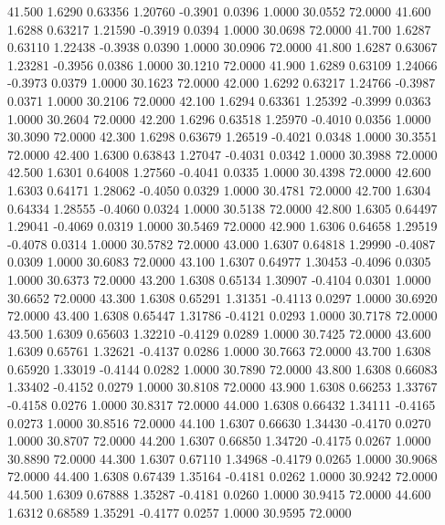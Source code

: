   41.500   1.6290   0.63356   1.20760  -0.3901   0.0396   1.0000  30.0552  72.0000
  41.600   1.6288   0.63217   1.21590  -0.3919   0.0394   1.0000  30.0698  72.0000
  41.700   1.6287   0.63110   1.22438  -0.3938   0.0390   1.0000  30.0906  72.0000
  41.800   1.6287   0.63067   1.23281  -0.3956   0.0386   1.0000  30.1210  72.0000
  41.900   1.6289   0.63109   1.24066  -0.3973   0.0379   1.0000  30.1623  72.0000
  42.000   1.6292   0.63217   1.24766  -0.3987   0.0371   1.0000  30.2106  72.0000
  42.100   1.6294   0.63361   1.25392  -0.3999   0.0363   1.0000  30.2604  72.0000
  42.200   1.6296   0.63518   1.25970  -0.4010   0.0356   1.0000  30.3090  72.0000
  42.300   1.6298   0.63679   1.26519  -0.4021   0.0348   1.0000  30.3551  72.0000
  42.400   1.6300   0.63843   1.27047  -0.4031   0.0342   1.0000  30.3988  72.0000
  42.500   1.6301   0.64008   1.27560  -0.4041   0.0335   1.0000  30.4398  72.0000
  42.600   1.6303   0.64171   1.28062  -0.4050   0.0329   1.0000  30.4781  72.0000
  42.700   1.6304   0.64334   1.28555  -0.4060   0.0324   1.0000  30.5138  72.0000
  42.800   1.6305   0.64497   1.29041  -0.4069   0.0319   1.0000  30.5469  72.0000
  42.900   1.6306   0.64658   1.29519  -0.4078   0.0314   1.0000  30.5782  72.0000
  43.000   1.6307   0.64818   1.29990  -0.4087   0.0309   1.0000  30.6083  72.0000
  43.100   1.6307   0.64977   1.30453  -0.4096   0.0305   1.0000  30.6373  72.0000
  43.200   1.6308   0.65134   1.30907  -0.4104   0.0301   1.0000  30.6652  72.0000
  43.300   1.6308   0.65291   1.31351  -0.4113   0.0297   1.0000  30.6920  72.0000
  43.400   1.6308   0.65447   1.31786  -0.4121   0.0293   1.0000  30.7178  72.0000
  43.500   1.6309   0.65603   1.32210  -0.4129   0.0289   1.0000  30.7425  72.0000
  43.600   1.6309   0.65761   1.32621  -0.4137   0.0286   1.0000  30.7663  72.0000
  43.700   1.6308   0.65920   1.33019  -0.4144   0.0282   1.0000  30.7890  72.0000
  43.800   1.6308   0.66083   1.33402  -0.4152   0.0279   1.0000  30.8108  72.0000
  43.900   1.6308   0.66253   1.33767  -0.4158   0.0276   1.0000  30.8317  72.0000
  44.000   1.6308   0.66432   1.34111  -0.4165   0.0273   1.0000  30.8516  72.0000
  44.100   1.6307   0.66630   1.34430  -0.4170   0.0270   1.0000  30.8707  72.0000
  44.200   1.6307   0.66850   1.34720  -0.4175   0.0267   1.0000  30.8890  72.0000
  44.300   1.6307   0.67110   1.34968  -0.4179   0.0265   1.0000  30.9068  72.0000
  44.400   1.6308   0.67439   1.35164  -0.4181   0.0262   1.0000  30.9242  72.0000
  44.500   1.6309   0.67888   1.35287  -0.4181   0.0260   1.0000  30.9415  72.0000
  44.600   1.6312   0.68589   1.35291  -0.4177   0.0257   1.0000  30.9595  72.0000
